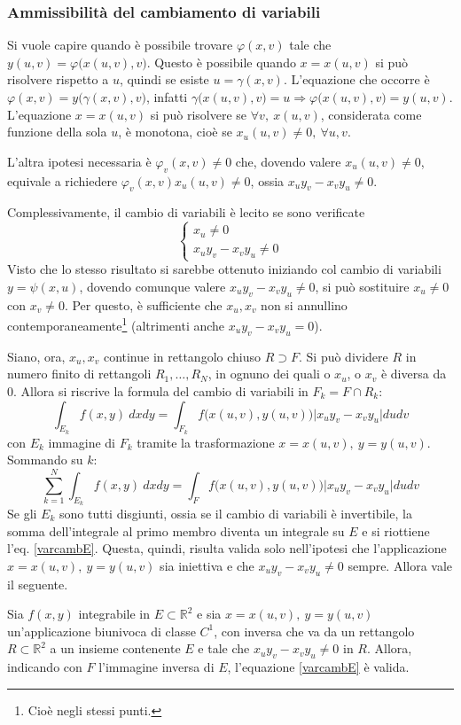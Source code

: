 \documentclass[10pt, a4paper]{scrartcl}
\theoremstyle{definition}
\numberwithin{esempio}{section}
\theoremstyle{definition}
\numberwithin{obs}{section}
\numberwithin{nota}{section}
\numberwithin{equation}{subsection}
\begin{document}
\subsubsection{Ammissibilit\`a del cambiamento di variabili}
Si vuole capire quando \`e possibile trovare $\varphi (x,v)$ tale che $y(u,v) = \varphi \big(x(u,v) , v\big)$. 
Questo \`e possibile quando $x=x(u,v)$ si pu\`o risolvere rispetto a $u$, quindi se esiste $u=\gamma(x,v)$.
L'equazione che occorre \`e $\varphi (x,v) = y\big(\gamma(x,v),v\big)$, infatti $\gamma\big(x(u,v) , v\big)= u\Rightarrow \varphi \big(x(u,v),v\big)=y(u,v)$.
L'equazione $x=x(u,v)$ si pu\`o risolvere se $\forall v, \ x(u,v)$, considerata come funzione della sola $u$, \`e monotona, cio\`e se $x_u(u,v) \neq 0, \ \forall u,v$.

L'altra ipotesi necessaria \`e $\varphi _v(x,v)\neq 0$ che, dovendo valere $x_u(u,v) \neq 0 $, equivale a richiedere $\varphi _v(x,v) x_u(u,v) \neq 0$, ossia $x_uy_v - x_v y_u \neq 0 $.

Complessivamente, il cambio di variabili \`e lecito se sono verificate
\begin{equation}
	\begin{cases}
		x_u \neq 0 \\
		x_uy_v - x_v y_u \neq 0 
	\end{cases}
\end{equation}
Visto che lo stesso risultato si sarebbe ottenuto iniziando col cambio di variabili $y = \psi (x,u)$, dovendo comunque valere $x_uy_v - x_v y_u \neq 0$, si pu\`o sostituire $x_u\neq 0 $ con $x_v \neq 0$. Per questo, \`e sufficiente che $x_u,x_v$ non si annullino contemporaneamente\footnote{Cio\`e negli stessi punti.} (altrimenti anche $x_uy_v - x_vy_u = 0$).

Siano, ora, $x_u, x_v$ continue in rettangolo chiuso $R\supset F$. 
Si pu\`o dividere $R$ in numero finito di rettangoli $R_1,\ldots, R_N$, in ognuno dei quali o $x_u$, o $x_v$ \`e diversa da $0$. 
Allora si riscrive la formula del cambio di variabili in $F_k = F \cap R_k$:
\[
\int_{E_k} f(x,y) \ dxdy = \int_{F_k}  f\big(x(u,v) , y(u,v)\big) \lvert x_u y_v - x_vy_u \rvert dudv
\] 
con $E_k$ immagine di $F_k$ tramite la trasformazione $x = x(u,v),\ y = y(u,v)$. Sommando su $k$:
\[
\sum_{k=1}^{N}\int_{E_k} f(x,y) \ dxdy = \int_{F}  f\big(x(u,v) , y(u,v)\big) \lvert x_u y_v - x_vy_u \rvert dudv
\] 
Se gli $E_k$ sono tutti disgiunti, ossia se il cambio di variabili \`e invertibile, la somma dell'integrale al primo membro diventa un integrale su $E$ e si riottiene l'eq. \ref{varcambE}.
Questa, quindi, risulta valida solo nell'ipotesi che l'applicazione $x=x(u,v), \ y=y(u,v)$ sia iniettiva e che $x_uy_v-x_vy_u \neq 0$ sempre. 
Allora vale il seguente.
\begin{teorema}
	{}{}
	Sia $f(x,y)$ integrabile in $E \subset \mathbb{R}^2$ e sia $x=x(u,v), \ y=y(u,v)$ un'applicazione biunivoca di classe $C^1$, con inversa che va da un rettangolo $R\subset \mathbb{R}^2$ a un insieme contenente $E$ e tale che $x_uy_v - x_vy_u \neq 0 $ in $R$. Allora, indicando con $F$ l'immagine inversa di $E$, l'equazione \ref{varcambE} \`e valida.
	
\end{teorema}
\end{document}
